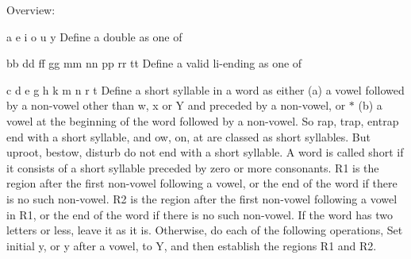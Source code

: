 \begin{DoxyParagraph}{Overview\+:}
\begin{DoxyItemize}
\item a e i o u y Define a double as one of
\item bb dd ff gg mm nn pp rr tt Define a valid li-\/ending as one of
\item c d e g h k m n r t Define a short syllable in a word as either (a) a vowel followed by a non-\/vowel other than w, x or Y and preceded by a non-\/vowel, or $\ast$ (b) a vowel at the beginning of the word followed by a non-\/vowel. So rap, trap, entrap end with a short syllable, and ow, on, at are classed as short syllables. But uproot, bestow, disturb do not end with a short syllable. A word is called short if it consists of a short syllable preceded by zero or more consonants. R1 is the region after the first non-\/vowel following a vowel, or the end of the word if there is no such non-\/vowel. R2 is the region after the first non-\/vowel following a vowel in R1, or the end of the word if there is no such non-\/vowel. If the word has two letters or less, leave it as it is. Otherwise, do each of the following operations, Set initial y, or y after a vowel, to Y, and then establish the regions R1 and R2.
\end{DoxyItemize}
\end{DoxyParagraph}
